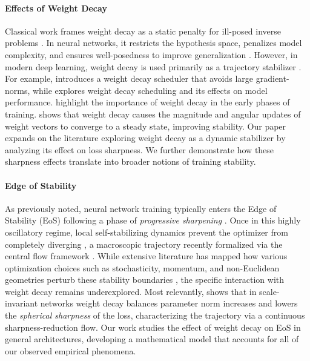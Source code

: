\documentclass{article}
\begin{document}
\paragraph{Effects of Weight Decay} Classical work frames weight decay as a static penalty for ill-posed inverse problems \citep{tikhonov,hoerl}. In neural networks, it restricts the hypothesis space, penalizes model complexity, and ensures well-posedness to improve generalization \citep{hanson, krogh}. However, in modern deep learning, weight decay is used primarily as a trajectory stabilizer \citep{dangelo, laarhoven}. For example, \citep{xie} introduces a weight decay scheduler that avoids large gradient-norms, while \citep{yun} explores weight decay scheduling and its effects on model performance. \citep{golatkar, bjorck} highlight the importance of weight decay in the early phases of training. \citep{kosson_rotational} shows that weight decay causes the magnitude and angular updates of weight vectors to converge to a steady state, improving stability. Our paper expands on the literature exploring weight decay as a dynamic stabilizer by analyzing its effect on loss sharpness. We further demonstrate how these sharpness effects translate into broader notions of training stability.

\paragraph{Edge of Stability}
As previously noted, neural network training typically enters the Edge of Stability (EoS) following a phase of \textit{progressive sharpening} \citep{jastrzebski, cohen}. Once in this highly oscillatory regime, local self-stabilizing dynamics prevent the optimizer from completely diverging \citep{damian_selfstab}, a macroscopic trajectory recently formalized via the central flow framework \citep{central_flow}. While extensive literature has mapped how various optimization choices such as stochasticity, momentum, and non-Euclidean geometries perturb these stability boundaries \citep{andreyev_beneventano, andreyev_momentum, islamov}, the specific interaction with weight decay remains underexplored. Most relevantly, \citep{lyu} shows that in scale-invariant networks weight decay balances parameter norm increases and lowers the \emph{spherical sharpness} of the loss, characterizing the trajectory via a continuous sharpness-reduction flow. Our work studies the effect of weight decay on EoS in general architectures, developing a mathematical model that accounts for all of our observed empirical phenomena.
\end{document}
